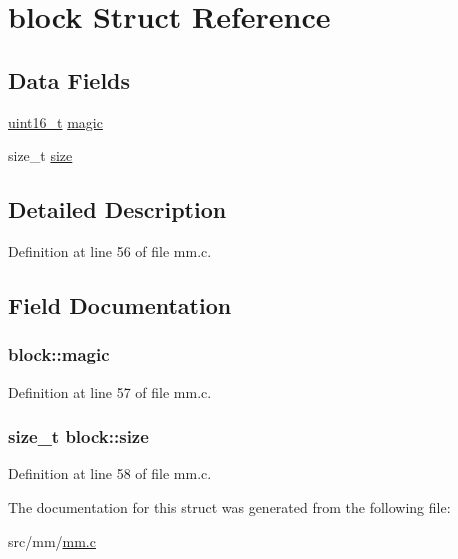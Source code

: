 \hypertarget{structblock}{\section{block Struct Reference}
\label{structblock}
}
\subsection*{Data Fields}
\begin{DoxyCompactItemize}
\item 
\hyperlink{aplus_8h_a5a8b2dc9e45a9ee81a94ef304fb62505}{uint16\+\_\+t} \hyperlink{structblock_a0dc8afecb033f59b42e0d8502a7f8ff0}{magic}
\item 
size\+\_\+t \hyperlink{structblock_a40c8e08013eb90aa6db19e1cbc7f3186}{size}
\end{DoxyCompactItemize}


\subsection{Detailed Description}


Definition at line 56 of file mm.\+c.



\subsection{Field Documentation}
\hypertarget{structblock_a0dc8afecb033f59b42e0d8502a7f8ff0}{
\subsubsection[{magic}]{ block\+::magic}}\label{structblock_a0dc8afecb033f59b42e0d8502a7f8ff0}


Definition at line 57 of file mm.\+c.

\hypertarget{structblock_a40c8e08013eb90aa6db19e1cbc7f3186}{
\subsubsection[{size}]{\setlength{\rightskip}{0pt plus 5cm}size\+\_\+t block\+::size}}\label{structblock_a40c8e08013eb90aa6db19e1cbc7f3186}


Definition at line 58 of file mm.\+c.



The documentation for this struct was generated from the following file\+:\begin{DoxyCompactItemize}
\item 
src/mm/\hyperlink{mm_8c}{mm.\+c}\end{DoxyCompactItemize}
